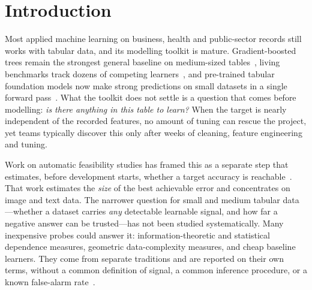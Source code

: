 
\section{Introduction}
\label{sec:intro}

Most applied machine learning on business, health and public-sector records still works with tabular data, and its modelling toolkit is mature. Gradient-boosted trees remain the strongest general baseline on medium-sized tables~\cite{grinsztajn2022}, living benchmarks track dozens of competing learners~\cite{erickson2025}, and pre-trained tabular foundation models now make strong predictions on small datasets in a single forward pass~\cite{hollmann2025}. What the toolkit does not settle is a question that comes before modelling: \emph{is there anything in this table to learn?} When the target is nearly independent of the recorded features, no amount of tuning can rescue the project, yet teams typically discover this only after weeks of cleaning, feature engineering and tuning.

Work on automatic feasibility studies has framed this as a separate step that estimates, before development starts, whether a target accuracy is reachable~\cite{renggli2020snoopy,renggli2023feasibility}. That work estimates the \emph{size} of the best achievable error and concentrates on image and text data. The narrower question for small and medium tabular data---whether a dataset carries \emph{any} detectable learnable signal, and how far a negative answer can be trusted---has not been studied systematically. Many inexpensive probes could answer it: information-theoretic and statistical dependence measures, geometric data-complexity measures, and cheap baseline learners. They come from separate traditions and are reported on their own terms, without a common definition of signal, a common inference procedure, or a known false-alarm rate~\cite{lorena2019,ross2014,ojala2010}.

